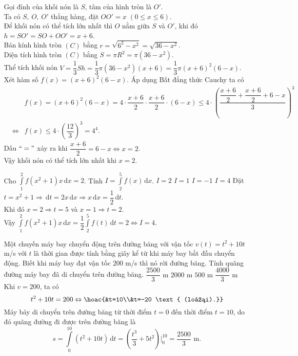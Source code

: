 \begin{ex}
{\begin{center}
		\end{center}
	Gọi đỉnh của khối nón là $S$, tâm của hình tròn là $O'$.\\
	Ta có $S,~O,~O'$ thẳng hàng, đặt $OO'=x$ $(0\le x\le6)$.\\
	Để khối nón có thể tích lớn nhất thì $O$ nằm giữa $S$ và $O'$, khi đó $h=SO'=SO+OO'=x+6$.\\
	Bán kính hình tròn $(C)$ bằng $r=\sqrt{6^2-x^2}=\sqrt{36-x^2}$.\\ Diện tích hình tròn $(C)$ bằng $S=\pi R^2=\pi(36-x^2)$.\\
	Thể tích khối nón $V=\dfrac{1}{3}Sh=\dfrac{1}{3}\pi(36-x^2)(x+6)=\dfrac{1}{3}\pi(x+6)^2(6-x)$.\\
	Xét hàm số $f(x)=(x+6)^2(6-x)$.
	Áp dụng Bất đẳng thức Cauchy ta có
	\begin{eqnarray*}
		& &f(x)=(x+6)^2(6-x)=4\cdot\dfrac{x+6}{2}\cdot\dfrac{x+6}{2}\cdot(6-x)\le4\cdot\left(\dfrac{\dfrac{x+6}{2}+\dfrac{x+6}{2}+6-x}{3}\right)^3 \\
		& \Leftrightarrow & f(x)\le4\cdot\left(\dfrac{12}{3}\right)^3=4^4.
	\end{eqnarray*}
	Dấu $``="$ xảy ra khi $\dfrac{x+6}{2}=6-x \Leftrightarrow x=2$.\\
	Vậy khối nón có thể tích lớn nhất khi $x=2$.
	}
\end{ex}

\begin{ex}%
	Cho $\displaystyle\int\limits_1^2 f(x^2+1)x\mathrm{\,d}x=2$. Tính  $I=\displaystyle\int\limits_2^5 f(x)\mathrm{\,d}x$.
	\choice
	{$I=2$}
	{$I=1$}
	{$I=-1$}
	{\True $I=4$}
	\loigiai
	{
		Đặt $t=x^2+1\Rightarrow\mathrm{\,d}t=2x\mathrm{\,d}x\Rightarrow x\mathrm{\,d}x=\dfrac{1}{2}\mathrm{\,d}t$.\\
		Khi đó $x=2\Rightarrow t=5$ và $x=1\Rightarrow t=2$.\\
		Vậy $\displaystyle\int\limits_1^2 f(x^2+1)x\mathrm{\,d}x=\dfrac{1}{2}\displaystyle\int\limits_2^5 f(t)\mathrm{\,d}t=2 \Leftrightarrow I=4$.
	}
\end{ex}

\begin{ex}%
	Một chuyến máy bay chuyển động trên đường băng với vận tốc $v(t)=t^2+10t~$m/s với $t$ là thời gian được tính bằng giây kể từ khi máy bay bắt đầu chuyển động. Biết khi máy bay đạt vận tốc $200$ m/s thì nó rời đường băng. Tính quãng đường máy bay đã di chuyển trên đường băng.
	\choice
	{\True $\dfrac{2500}{3}$ m}
	{$2000$ m}
	{$500$ m}
	{$\dfrac{4000}{3}$ m}
	\loigiai
	{
		Khi $v=200$, ta có $$t^2+10t=200\Leftrightarrow \hoac{&t=10\\&t=-20 \text{ (loại).}}$$
		Máy báy di chuyển trên đường băng từ thời điểm $t=0$ đến thời điểm $t=10$, do đó quãng đường đi được trên đường băng là
		$$s=\displaystyle\int\limits_0^{10}\left(t^2+10t\right)\mathrm{\,d}t=\left(\dfrac{t^3}{3}+5t^2\right)\bigg|_0^{10}=\dfrac{2500}{3}\text{ m}.$$
	}
\end{ex}

